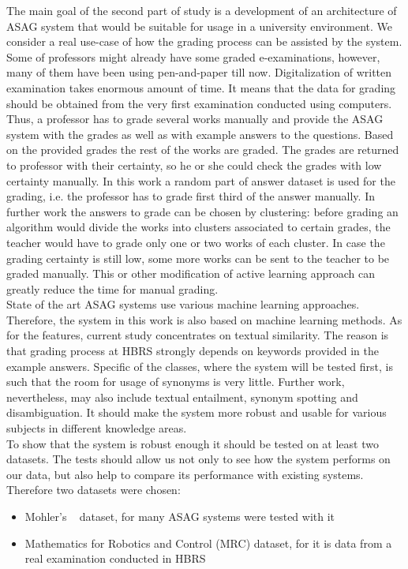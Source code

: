 The main goal of the second part of study is a development of an architecture of ASAG system that would be suitable for usage in a university environment. We consider a real use-case of how the grading process can be assisted by the system. Some of professors might already have some graded e-examinations, however, many of them have been using pen-and-paper till now. Digitalization of written examination takes enormous amount of time. It means that the data for grading should be obtained from the very first examination conducted using computers. Thus, a professor has to grade several works manually and provide the ASAG system with the grades as well as with example answers to the questions. Based on the provided grades the rest of the works are graded. The grades are returned to professor with their certainty, so he or she could check the grades with low certainty manually. In this work a random part of answer dataset is used for the grading, i.e. the professor has to grade first third of the answer manually. In further work the answers to grade can be chosen by clustering: before grading an algorithm would divide the works into clusters associated to certain grades, the teacher would have to grade only one or two works of each cluster. In case the grading certainty is still low, some more works can be sent to the teacher to be graded manually. This or other modification of active learning approach can greatly reduce the time for manual grading. \\

State of the art ASAG systems use various machine learning approaches. Therefore, the system in this work is also based on machine learning methods. As for the features, current study concentrates on textual similarity. The reason is that grading process at HBRS strongly depends on keywords provided in the example answers. Specific of the classes, where the system will be tested first, is such that the room for usage of synonyms is very little. Further work, nevertheless, may also include textual entailment, synonym spotting and disambiguation. It should make the system more robust and usable for various subjects in different knowledge areas.\\

To show that the system is robust enough it should be tested on at least two datasets. The tests should allow us not only to see how the system performs on our data, but also help to compare its performance with existing systems. Therefore two datasets were chosen:
\begin{itemize}
\item Mohler's ~\cite{Mohler} dataset, for many ASAG systems were tested with it
\item Mathematics for Robotics and Control (MRC) dataset, for it is data from a real examination conducted in HBRS
\end{itemize} 
 
